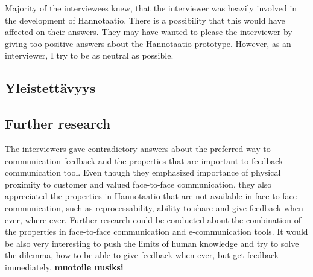 \documentclass[english,12pt,a4paper,pdftex]{article}
\begin{document}
Majority of the interviewees knew, that the interviewer was heavily involved in the development of Hannotaatio. There is a possibility that this would have affected on their answers. They may have wanted to please the interviewer by giving too positive answers about the Hannotaatio prototype. However, as an interviewer, I try to be as neutral as possible.

\subsection{Yleistettävyys}

\subsection{Further research}

The interviewers gave contradictory answers about the preferred way to communication feedback and the properties that are important to feedback communication tool. Even though they emphasized importance of physical proximity to customer and valued face-to-face communication, they also appreciated the properties in Hannotaatio that are not available in face-to-face communication, such as reprocessability, ability to share and give feedback when ever, where ever. Further research could be conducted about the combination of the properties in face-to-face communication and e-communication tools. It would be also very interesting to push the limits of human knowledge and try to solve the dilemma, how to be able to give feedback when ever, but get feedback immediately. \textbf{muotoile uusiksi}
\end{document}
